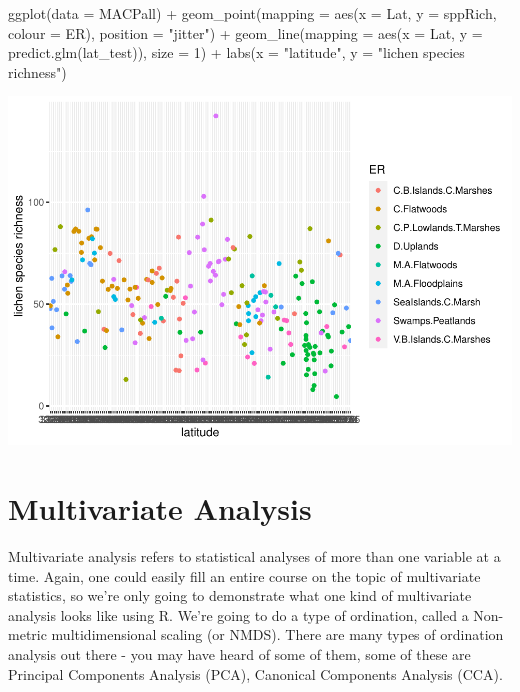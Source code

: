 \documentclass[
]{book}
\newenvironment{Shaded}{\begin{snugshade}}{\end{snugshade}}
\newcommand{\AttributeTok}[1]{\textcolor[rgb]{0.77,0.63,0.00}{#1}}
\newcommand{\DecValTok}[1]{\textcolor[rgb]{0.00,0.00,0.81}{#1}}
\newcommand{\FunctionTok}[1]{\textcolor[rgb]{0.00,0.00,0.00}{#1}}
\newcommand{\NormalTok}[1]{#1}
\newcommand{\SpecialCharTok}[1]{\textcolor[rgb]{0.00,0.00,0.00}{#1}}
\newcommand{\StringTok}[1]{\textcolor[rgb]{0.31,0.60,0.02}{#1}}
\begin{document}
\begin{Shaded}
\begin{Highlighting}[]
\FunctionTok{ggplot}\NormalTok{(}\AttributeTok{data =}\NormalTok{ MACPall) }\SpecialCharTok{+}
  \FunctionTok{geom\_point}\NormalTok{(}\AttributeTok{mapping =} \FunctionTok{aes}\NormalTok{(}\AttributeTok{x =}\NormalTok{ Lat, }\AttributeTok{y =}\NormalTok{ sppRich, }\AttributeTok{colour =}\NormalTok{ ER), }\AttributeTok{position =} \StringTok{"jitter"}\NormalTok{) }\SpecialCharTok{+}
  \FunctionTok{geom\_line}\NormalTok{(}\AttributeTok{mapping =} \FunctionTok{aes}\NormalTok{(}\AttributeTok{x =}\NormalTok{ Lat, }\AttributeTok{y =} \FunctionTok{predict.glm}\NormalTok{(lat\_test)), }\AttributeTok{size =} \DecValTok{1}\NormalTok{) }\SpecialCharTok{+}
  \FunctionTok{labs}\NormalTok{(}\AttributeTok{x =} \StringTok{"latitude"}\NormalTok{, }\AttributeTok{y =} \StringTok{"lichen species richness"}\NormalTok{)}
\end{Highlighting}
\end{Shaded}

\includegraphics{bookdown-demo_files/figure-latex/unnamed-chunk-15-1.pdf}

\hypertarget{multivariate-analysis}{%
\section{Multivariate Analysis}\label{multivariate-analysis}}

Multivariate analysis refers to statistical analyses of more than one variable at a time. Again, one could easily fill an entire course on the topic of multivariate statistics, so we're only going to demonstrate what one kind of multivariate analysis looks like using R. We're going to do a type of ordination, called a Non-metric multidimensional scaling (or NMDS). There are many types of ordination analysis out there - you may have heard of some of them, some of these are Principal Components Analysis (PCA), Canonical Components Analysis (CCA).
\end{document}
